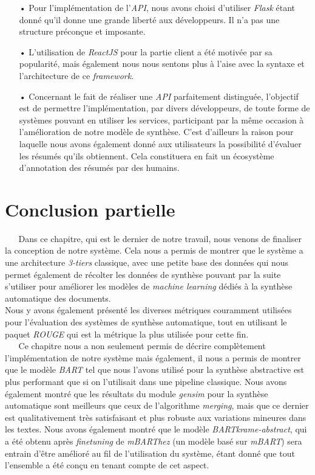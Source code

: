 \begin{itemize}
\item[•] Pour l'implémentation de l'\textit{API}, nous avons choisi d'utiliser \textit{Flask} étant donné qu'il donne une grande liberté aux développeurs. Il n'a pas une structure préconçue et imposante.
\item[•] L'utilisation de \textit{ReactJS} pour la partie client a été motivée par sa popularité, mais également nous nous sentons plus à l'aise avec la syntaxe et l'architecture de ce \textit{framework}.
\item[•] Concernant le fait de réaliser une \textit{API} parfaitement distinguée, l'objectif est de permettre l'implémentation, par divers développeurs, de toute forme de systèmes pouvant en utiliser les services, participant par la même occasion à l'amélioration de notre modèle de synthèse. C'est d'ailleurs la raison pour laquelle nous avons également donné aux utilisateurs la possibilité d'évaluer les résumés qu'ils obtiennent. Cela constituera en fait un écosystème d'annotation des résumés par des humains.
\end{itemize}
\section{Conclusion partielle}
$ _{} $ $ _{} $ $ _{} $ $ _{} $ $ _{} $Dans ce chapitre, qui est le dernier de notre travail, nous venons de finaliser la conception de notre système. Cela nous a permis de montrer que le système a une ar\-chi\-tec\-tu\-re \textit{3-tiers} classique, avec une petite base des données qui nous permet également de récolter les données de synthèse pouvant par la suite s'utiliser pour améliorer les modèles de \textit{machine learning} dédiés à la synthèse automatique des documents.\\
Nous y avons également présenté les diverses métriques couramment utilisées pour l'é\-va\-lua\-tion des systèmes de synthèse automatique, tout en utilisant le paquet \textit{ROUGE} qui est la métrique la plus utilisée pour cette fin.\\
$ _{} $ $ _{} $ $ _{} $ $ _{} $ $ _{} $Ce chapitre nous a non seulement permis de décrire complètement l'implémentation de notre système mais également, il nous a permis de montrer que le modèle \textit{BART} tel que nous l'avons utilisé pour la synthèse abstractive est plus performant que si on l'utilisait dans une pipeline classique. Nous avons également montré que les résultats du module \textit{gensim} pour la synthèse automatique sont meilleurs que ceux de l'algorithme \textit{merging}, mais que ce dernier est qua\-li\-ta\-ti\-ve\-ment très satisfaisant et plus robuste aux variations mineures dans les textes. Nous avons également montré que le modèle \textit{BARTkrame-abstract}, qui a été obtenu après \textit{finetuning} de \textit{mBARThez} (un modèle basé sur \textit{mBART}) sera entrain d'être amélioré au fil de l'utilisation du système, étant donné que tout l'ensemble a été conçu en tenant compte de cet aspect.